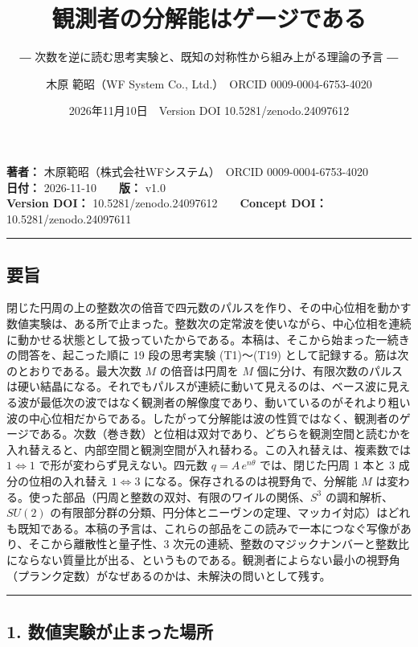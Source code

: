 \documentclass[
  a4paper,
]{ltjsarticle}
\title{観測者の分解能はゲージである}
\subtitle{―
次数を逆に読む思考実験と、既知の対称性から組み上がる理論の予言 ―}
\author{木原 範昭（WF System Co., Ltd.）　ORCID 0009-0004-6753-4020}
\date{2026年11月10日　Version DOI 10.5281/zenodo.24097612}
\begin{document}
\maketitle

\textbf{著者：} 木原範昭（株式会社WFシステム）　ORCID
0009-0004-6753-4020\\
\textbf{日付：} 2026-11-10　　\textbf{版：} v1.0\\
\textbf{Version DOI：} 10.5281/zenodo.24097612　　\textbf{Concept DOI：}
10.5281/zenodo.24097611

\begin{center}\rule{0.5\linewidth}{0.5pt}\end{center}

\subsection{要旨}\label{ux8981ux65e8}

閉じた円周の上の整数次の倍音で四元数のパルスを作り、その中心位相を動かす数値実験は、ある所で止まった。整数次の定常波を使いながら、中心位相を連続に動かせる状態として扱っていたからである。本稿は、そこから始まった一続きの問答を、起こった順に
19 段の思考実験 (T1)〜(T19)
として記録する。筋は次のとおりである。最大次数 \(M\) の倍音は円周を
\(M\)
個に分け、有限次数のパルスは硬い結晶になる。それでもパルスが連続に動いて見えるのは、ベース波に見える波が最低次の波ではなく観測者の解像度であり、動いているのがそれより粗い波の中心位相だからである。したがって分解能は波の性質ではなく、観測者のゲージである。次数（巻き数）と位相は双対であり、どちらを観測空間と読むかを入れ替えると、内部空間と観測空間が入れ替わる。この入れ替えは、複素数では
\(1\Leftrightarrow1\) で形が変わらず見えない。四元数
\(q=A\,e^{n\theta}\) では、閉じた円周 1 本と 3 成分の位相の入れ替え
\(1\Leftrightarrow3\) になる。保存されるのは視野角で、分解能 \(M\)
は変わる。使った部品（円周と整数の双対、有限のワイルの関係、\(S^3\)
の調和解析、\(SU(2)\)
の有限部分群の分類、円分体とニーヴンの定理、マッカイ対応）はどれも既知である。本稿の予言は、これらの部品をこの読みで一本につなぐ写像があり、そこから離散性と量子性、3
次元の連続、整数のマジックナンバーと整数比にならない質量比が出る、というものである。観測者によらない最小の視野角（プランク定数）がなぜあるのかは、未解決の問いとして残す。

\begin{center}\rule{0.5\linewidth}{0.5pt}\end{center}

\subsection{1.
数値実験が止まった場所}\label{ux6570ux5024ux5b9fux9a13ux304cux6b62ux307eux3063ux305fux5834ux6240}
\end{document}
